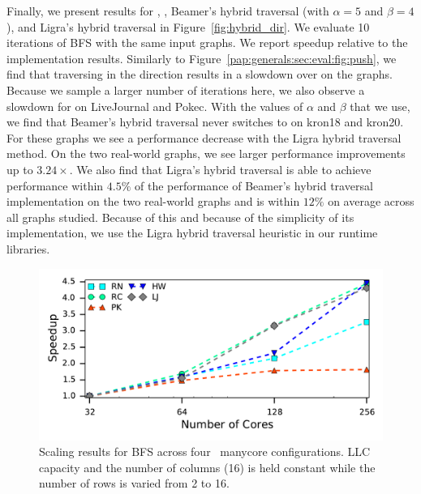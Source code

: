 \hybridresults
Finally, we present results for \push, \pull, Beamer's hybrid traversal (with $\alpha=5$ and $\beta=4$), and Ligra's hybrid traversal in Figure~\ref{fig:hybrid_dir}.
We evaluate 10 iterations of BFS with the same input graphs. 
We report speedup relative to the \push implementation results.
Similarly to Figure~\ref{pap:generals:sec:eval:fig:push}, we find that traversing in the \pull direction results in a slowdown over \push on the \kron graphs. 
Because we sample a larger number of iterations here, we also observe a slowdown for \pull on LiveJournal and Pokec. 
With the values of $\alpha$ and $\beta$ that we use, we find that Beamer's hybrid traversal never switches to \pull on kron18 and kron20. 
For these graphs we see a performance decrease with the Ligra hybrid traversal method.
On the two real-world graphs, we see larger performance improvements up to $3.24\times$.
We also find that Ligra's hybrid traversal is able to achieve performance within $4.5\%$ of the performance of Beamer's hybrid traversal implementation on the two real-world graphs and is within $12\%$ on average across all graphs studied.
Because of this and because of the simplicity of its implementation, we use the Ligra hybrid traversal heuristic in our runtime libraries.
 

\begin{figure}[ht]
    \centering
    \includegraphics[scale = 0.6]{graphit-figures/hb-scaling-speedup.pdf}
    \caption{Scaling results for BFS across four \hb~manycore configurations. LLC capacity and the number of columns (16) is held constant while the number of rows is varied from 2 to 16.} 
    \label{pap:generals:sec:eval:fig:scaling}
\end{figure}

\hbBlockingEvalTab

